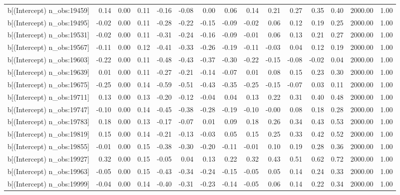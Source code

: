 \begin{table}[ht]
\begin{tabular}{rrrrrrrrrrrrrrr}
  b[(Intercept) n\_obs:19459] & 0.14 & 0.00 & 0.11 & -0.16 & -0.08 & 0.00 & 0.06 & 0.14 & 0.21 & 0.27 & 0.35 & 0.40 & 2000.00 & 1.00 \\ 
  b[(Intercept) n\_obs:19495] & -0.02 & 0.00 & 0.11 & -0.28 & -0.22 & -0.15 & -0.09 & -0.02 & 0.06 & 0.12 & 0.19 & 0.25 & 2000.00 & 1.00 \\ 
  b[(Intercept) n\_obs:19531] & -0.02 & 0.00 & 0.11 & -0.31 & -0.24 & -0.16 & -0.09 & -0.01 & 0.06 & 0.13 & 0.21 & 0.27 & 2000.00 & 1.00 \\ 
  b[(Intercept) n\_obs:19567] & -0.11 & 0.00 & 0.12 & -0.41 & -0.33 & -0.26 & -0.19 & -0.11 & -0.03 & 0.04 & 0.12 & 0.19 & 2000.00 & 1.00 \\ 
  b[(Intercept) n\_obs:19603] & -0.22 & 0.00 & 0.11 & -0.48 & -0.43 & -0.37 & -0.30 & -0.22 & -0.15 & -0.08 & -0.02 & 0.04 & 2000.00 & 1.00 \\ 
  b[(Intercept) n\_obs:19639] & 0.01 & 0.00 & 0.11 & -0.27 & -0.21 & -0.14 & -0.07 & 0.01 & 0.08 & 0.15 & 0.23 & 0.30 & 2000.00 & 1.00 \\ 
  b[(Intercept) n\_obs:19675] & -0.25 & 0.00 & 0.14 & -0.59 & -0.51 & -0.43 & -0.35 & -0.25 & -0.15 & -0.07 & 0.03 & 0.11 & 2000.00 & 1.00 \\ 
  b[(Intercept) n\_obs:19711] & 0.13 & 0.00 & 0.13 & -0.20 & -0.12 & -0.04 & 0.04 & 0.13 & 0.22 & 0.31 & 0.40 & 0.48 & 2000.00 & 1.00 \\ 
  b[(Intercept) n\_obs:19747] & -0.10 & 0.00 & 0.14 & -0.45 & -0.38 & -0.28 & -0.19 & -0.10 & -0.00 & 0.08 & 0.18 & 0.28 & 2000.00 & 1.00 \\ 
  b[(Intercept) n\_obs:19783] & 0.18 & 0.00 & 0.13 & -0.17 & -0.07 & 0.01 & 0.09 & 0.18 & 0.26 & 0.34 & 0.43 & 0.53 & 2000.00 & 1.00 \\ 
  b[(Intercept) n\_obs:19819] & 0.15 & 0.00 & 0.14 & -0.21 & -0.13 & -0.03 & 0.05 & 0.15 & 0.25 & 0.33 & 0.42 & 0.52 & 2000.00 & 1.00 \\ 
  b[(Intercept) n\_obs:19855] & -0.01 & 0.00 & 0.15 & -0.38 & -0.30 & -0.20 & -0.11 & -0.01 & 0.10 & 0.19 & 0.28 & 0.36 & 2000.00 & 1.00 \\ 
  b[(Intercept) n\_obs:19927] & 0.32 & 0.00 & 0.15 & -0.05 & 0.04 & 0.13 & 0.22 & 0.32 & 0.43 & 0.51 & 0.62 & 0.72 & 2000.00 & 1.00 \\ 
  b[(Intercept) n\_obs:19963] & -0.05 & 0.00 & 0.15 & -0.43 & -0.34 & -0.24 & -0.15 & -0.05 & 0.05 & 0.14 & 0.24 & 0.33 & 2000.00 & 1.00 \\ 
  b[(Intercept) n\_obs:19999] & -0.04 & 0.00 & 0.14 & -0.40 & -0.31 & -0.23 & -0.14 & -0.05 & 0.06 & 0.14 & 0.22 & 0.34 & 2000.00 & 1.00 \\ 

\end{tabular}
\end{table}
